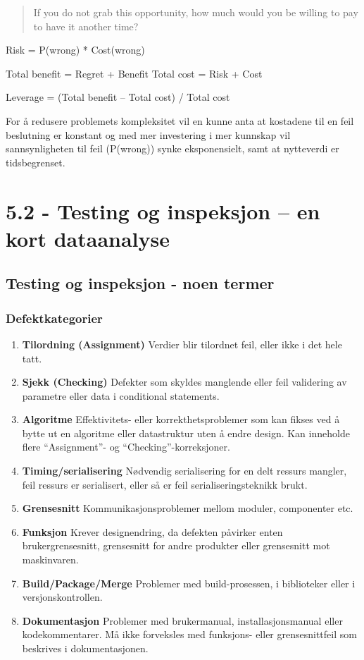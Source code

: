 \begin{quote}
If you do not grab this opportunity, how much would you be willing to
pay to have it another time?

\end{quote}
Risk = P(wrong) * Cost(wrong)

Total benefit = Regret + Benefit Total cost = Risk + Cost

Leverage = (Total benefit -- Total cost) / Total cost

For å redusere problemets kompleksitet vil en kunne anta at kostadene
til en feil beslutning er konstant og med mer investering i mer kunnskap
vil sannsynligheten til feil (P(wrong)) synke eksponensielt, samt at
nytteverdi er tidsbegrenset.

\section{5.2 - Testing og inspeksjon -- en kort dataanalyse}

\subsection{Testing og inspeksjon - noen termer}

\subsubsection{Defektkategorier}

\begin{enumerate}[1.]
\item
  \textbf{Tilordning (Assignment)} Verdier blir tilordnet feil, eller
  ikke i det hele tatt.
\item
  \textbf{Sjekk (Checking)} Defekter som skyldes manglende eller feil
  validering av parametre eller data i conditional statements.
\item
  \textbf{Algoritme} Effektivitets- eller korrekthetsproblemer som kan
  fikses ved å bytte ut en algoritme eller datastruktur uten å endre
  design. Kan inneholde flere ``Assignment''- og
  ``Checking''-korreksjoner.
\item
  \textbf{Timing/serialisering} Nødvendig serialisering for en delt
  ressurs mangler, feil ressurs er serialisert, eller så er feil
  serialiseringsteknikk brukt.
\item
  \textbf{Grensesnitt} Kommunikasjonsproblemer mellom moduler,
  componenter etc.
\item
  \textbf{Funksjon} Krever designendring, da defekten påvirker enten
  brukergrensesnitt, grensesnitt for andre produkter eller grensesnitt
  mot maskinvaren.
\item
  \textbf{Build/Package/Merge} Problemer med build-prosessen, i
  biblioteker eller i versjonskontrollen.
\item
  \textbf{Dokumentasjon} Problemer med brukermanual, installasjonsmanual
  eller kodekommentarer. Må ikke forveksles med funksjons- eller
  grensesnittfeil som beskrives i dokumentasjonen.
\end{enumerate}
